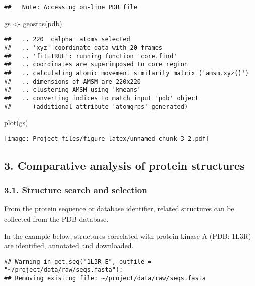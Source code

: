\documentclass[
]{article}
\newenvironment{Shaded}{\begin{snugshade}}{\end{snugshade}}
\newcommand{\FunctionTok}[1]{\textcolor[rgb]{0.00,0.00,0.00}{#1}}
\newcommand{\NormalTok}[1]{#1}
\newcommand{\OtherTok}[1]{\textcolor[rgb]{0.56,0.35,0.01}{#1}}
\begin{document}
\begin{verbatim}
##   Note: Accessing on-line PDB file
\end{verbatim}

\begin{Shaded}
\begin{Highlighting}[]
\NormalTok{gs }\OtherTok{\textless{}{-}} \FunctionTok{geostas}\NormalTok{(pdb)}
\end{Highlighting}
\end{Shaded}

\begin{verbatim}
##   .. 220 'calpha' atoms selected
##   .. 'xyz' coordinate data with 20 frames 
##   .. 'fit=TRUE': running function 'core.find'
##   .. coordinates are superimposed to core region
##   .. calculating atomic movement similarity matrix ('amsm.xyz()') 
##   .. dimensions of AMSM are 220x220
##   .. clustering AMSM using 'kmeans' 
##   .. converting indices to match input 'pdb' object 
##      (additional attribute 'atomgrps' generated)
\end{verbatim}

\begin{Shaded}
\begin{Highlighting}[]
\FunctionTok{plot}\NormalTok{(gs)}
\end{Highlighting}
\end{Shaded}

\texttt{[image: Project\_files/figure-latex/unnamed-chunk-3-2.pdf]}

\hypertarget{comparative-analysis-of-protein-structures}{%
\subsection{3. Comparative analysis of protein
structures}\label{comparative-analysis-of-protein-structures}}

\hypertarget{structure-search-and-selection}{%
\subsubsection{3.1. Structure search and
selection}\label{structure-search-and-selection}}

From the protein sequence or database identifier, related structures can
be collected from the PDB database.

In the example below, structures correlated with protein kinase A (PDB:
1L3R) are identified, annotated and downloaded.

\begin{verbatim}
## Warning in get.seq("1L3R_E", outfile = "~/project/data/raw/seqs.fasta"):
## Removing existing file: ~/project/data/raw/seqs.fasta
\end{verbatim}
\end{document}
